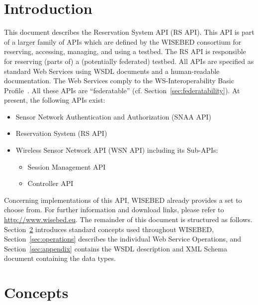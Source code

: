 \documentclass[a4paper,11pt]{article}
\begin{document}
    \prepareTitle

	\section{Introduction}
	\label{sec:introduction}
This document describes the Reservation System API (RS API). This API is part of a larger family of APIs which are defined by the WISEBED consortium for reserving, accessing, managing, and using a testbed. The RS API is responsible for reserving (parts of) a (potentially federated) testbed. All APIs are specified as standard Web Services using WSDL documents and a human-readable documentation. The Web Services comply to the WS-Interoperability Basic Profile~\cite{wsi-basic-profile-1-1}. All these APIs are ``federatable'' (cf. Section~\ref{sec:federatability}). At present, the following APIs exist:

\begin{itemize}
	\item Sensor Network Authentication and Authorization (SNAA API)
	\item Reservation System (RS API)
	\item Wireless Sensor Network API (WSN API) including its Sub-APIs:
	\begin{itemize}
		\item Session Management API
		\item Controller API
	\end{itemize}
\end{itemize}

Concerning implementations of this API, WISEBED already provides a set to choose from. For further information and download links, please refer to \url{http://www.wisebed.eu}. The remainder of this document is structured as follows. Section~\ref{sec:concepts} introduces standard concepts used throughout WISEBED, Section~\ref{sec:operations} describes the individual Web Service Operations, and Section~\ref{sec:appendix} contains the WSDL description and XML Schema document containing the data types.

	\section{Concepts}
	\label{sec:concepts}
\end{document}
